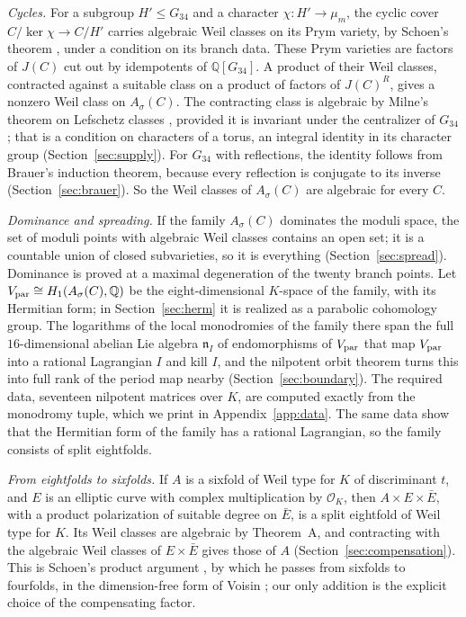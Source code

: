 \documentclass[11pt]{amsart}
\theoremstyle{definition}
\theoremstyle{remark}
\newcommand{\Q}{\mathbb Q}
\newcommand{\Vp}{V_{\rm par}}
\begin{document}
\emph{Cycles.} For a subgroup $H'\le G_{34}$ and a character $\chi\colon H'\to\mu_m$, the cyclic cover $C/\ker\chi\to C/H'$ carries algebraic Weil classes on its Prym variety, by Schoen's theorem \cite{Schoen88}, under a condition on its branch data. These Prym varieties are factors of $J(C)$ cut out by idempotents of $\Q[G_{34}]$. A product of their Weil classes, contracted against a suitable class on a product of factors of $J(C)^R$, gives a nonzero Weil class on $A_\sigma(C)$. The contracting class is algebraic by Milne's theorem on Lefschetz classes \cite{Milne}, provided it is invariant under the centralizer of $G_{34}$; that is a condition on characters of a torus, an integral identity in its character group (Section~\ref{sec:supply}). For $G_{34}$ with reflections, the identity follows from Brauer's induction theorem, because every reflection is conjugate to its inverse (Section~\ref{sec:brauer}). So the Weil classes of $A_\sigma(C)$ are algebraic for every $C$.

\emph{Dominance and spreading.} If the family $A_\sigma(C)$ dominates the moduli space, the set of moduli points with algebraic Weil classes contains an open set; it is a countable union of closed subvarieties, so it is everything (Section~\ref{sec:spread}). Dominance is proved at a maximal degeneration of the twenty branch points. Let $\Vp\cong H_1(A_\sigma(C),\Q)$ be the eight-dimensional $K$-space of the family, with its Hermitian form; in Section~\ref{sec:herm} it is realized as a parabolic cohomology group. The logarithms of the local monodromies of the family there span the full $16$-dimensional abelian Lie algebra $\mathfrak n_I$ of endomorphisms of $\Vp$ that map $\Vp$ into a rational Lagrangian $I$ and kill $I$, and the nilpotent orbit theorem turns this into full rank of the period map nearby (Section~\ref{sec:boundary}). The required data, seventeen nilpotent matrices over $K$, are computed exactly from the monodromy tuple, which we print in Appendix~\ref{app:data}. The same data show that the Hermitian form of the family has a rational Lagrangian, so the family consists of split eightfolds.

\emph{From eightfolds to sixfolds.} If $A$ is a sixfold of Weil type for $K$ of discriminant $t$, and $E$ is an elliptic curve with complex multiplication by $\mathcal O_K$, then $A\times E\times\bar E$, with a product polarization of suitable degree on $\bar E$, is a split eightfold of Weil type for $K$. Its Weil classes are algebraic by Theorem~A, and contracting with the algebraic Weil classes of $E\times\bar E$ gives those of $A$ (Section~\ref{sec:compensation}). This is Schoen's product argument \cite[Proposition~10]{Schoen98}, by which he passes from sixfolds to fourfolds, in the dimension-free form of Voisin \cite[Lemme~2.9]{Voisin}; our only addition is the explicit choice of the compensating factor.
\end{document}
